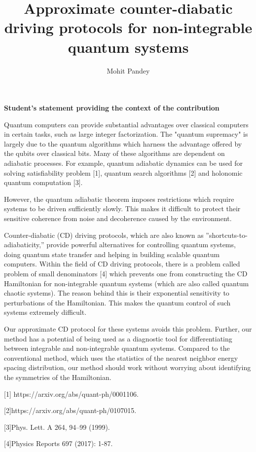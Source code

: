 \documentclass[11pt,a4paper]{article}
\author{Mohit Pandey}
\title{Approximate counter-diabatic driving protocols for non-integrable quantum systems  }
\begin{document}
\maketitle
\textbf{Student's statement  providing the context of the contribution}


Quantum computers can provide substantial advantages over classical computers in certain tasks, such as large integer factorization. The "quantum supremacy" is largely due to the quantum algorithms which harness the advantage offered by the qubits over classical bits. Many of these algorithms are dependent on adiabatic processes. For example, quantum adiabatic dynamics can be used for solving satisfiability problem [1], quantum search algorithms [2] and holonomic quantum computation [3]. 

However, the quantum adiabatic theorem imposes restrictions which require systems to be driven sufficiently slowly. This makes it difficult to protect their sensitive coherence from noise and decoherence caused by the environment.


Counter-diabatic (CD) driving protocols, which are also known as ”shortcuts-to-adiabaticity,” provide powerful alternatives for controlling quantum systems, doing quantum state transfer and helping in building scalable quantum computers. Within the field of CD driving protocols, there is a problem called problem of small denominators  [4] which prevents one from constructing the CD Hamiltonian for non-integrable quantum systems (which are also called quantum chaotic systems). The reason behind this is their exponential sensitivity to perturbations of the Hamiltonian. This makes the quantum control  of such systems extremely difficult.

Our approximate CD protocol for these systems avoids this problem. Further, our method has a potential of being used as a diagnostic tool for differentiating between integrable and non-integrable quantum systems. Compared to the conventional method, which uses the statistics of the nearest neighbor energy spacing distribution, our method should work without worrying about identifying the symmetries of the Hamiltonian. 

[1] https://arxiv.org/abs/quant-ph/0001106.

[2]https://arxiv.org/abs/quant-ph/0107015.

[3]Phys. Lett. A 264, 94–99 (1999).

[4]Physics Reports 697 (2017): 1-87.
\end{document}
